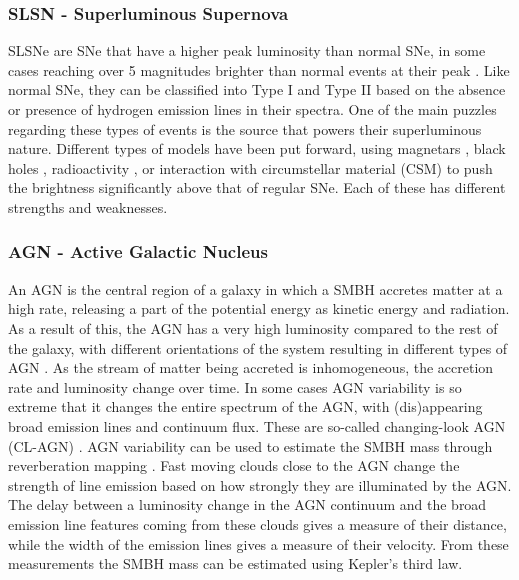 \documentclass[a4paper,oneside,12pt, class=Latex/Classes/PhDthesisPSnPDF, crop=false]{standalone}
\begin{document}
\subsubsection{SLSN - Superluminous Supernova}
SLSNe are SNe that have a higher peak luminosity than normal SNe, in some cases reaching over 5 magnitudes brighter than normal events at their peak \citep{SLSN_Gal-Yam}. Like normal SNe, they can be classified into Type I and Type II based on the absence or presence of hydrogen emission lines in their spectra. One of the main puzzles regarding these types of events is the source that powers their superluminous nature. Different types of models have been put forward, using magnetars \citep{Maeda_SLSN_magentar}, black holes \citep{SLSN_BH}, radioactivity \citep{Kasen_SLSN_pair_instab}, or interaction with circumstellar material (CSM) \citep{Late-time_CSM_SLSNE_I} to push the brightness significantly above that of regular SNe. Each of these has different strengths and weaknesses.


\subsubsection{AGN - Active Galactic Nucleus}
An AGN is the central region of a galaxy in which a SMBH accretes matter at a high rate, releasing a part of the potential energy as kinetic energy and radiation. As a result of this, the AGN has a very high luminosity compared to the rest of the galaxy, with different orientations of the system resulting in different types of AGN \citep{Antonucci_1993_AGN, Urry_1995_AGN}. As the stream of matter being accreted is inhomogeneous, the accretion rate and luminosity change over time. In some cases AGN variability is so extreme that it changes the entire spectrum of the AGN, with (dis)appearing broad emission lines and continuum flux. These are so-called changing-look AGN (CL-AGN) \citep[see][for a review]{CLAGN}. AGN variability can be used to estimate the SMBH mass through reverberation mapping \citep{Reverberation_mapping, Reverberation_Peterson}. Fast moving clouds close to the AGN change the strength of line emission based on how strongly they are illuminated by the AGN. The delay between a luminosity change in the AGN continuum and the broad emission line features coming from these clouds gives a measure of their distance, while the width of the emission lines gives a measure of their velocity. From these measurements the SMBH mass can be estimated using Kepler's third law.
\end{document}
